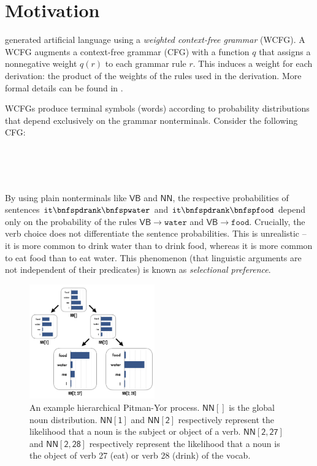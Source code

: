 \documentclass[11pt]{article}
\renewcommand{\bnfpn}[1]{\mathsf{#1}}
\renewcommand{\bnfpo}{\rightarrow}
\renewcommand{\bnfts}[1]{\mathtt{#1}}
\begin{document}
\section{Motivation}



\citet{white-cotterell-2021-examining} generated artificial language using a \emph{weighted context-free grammar} (WCFG). A WCFG augments a context-free grammar (CFG) with a function $q$ that assigns a nonnegative weight $q(r)$ to each grammar rule $r$. This induces a weight for each derivation: the product of the weights of the rules used in the derivation. More formal details can be found in \citet{collins2013lexicalized}. 

WCFGs produce terminal symbols (words) according to probability distributions that depend exclusively on the grammar nonterminals. Consider the following CFG:
\begin{bnf*}
 {\bnfpn{NN} \bnfsp \bnfpn{VP}} \\
 {\bnfpn{VB} \bnfsp \bnfpn{NN}}\\
 {\bnfts{drank} \bnfor \bnfts{ate}} \\
 {\bnfts{you} \bnfor \bnfts{it} \bnfor \bnfts{water} \bnfor \bnfts{food}}
\end{bnf*}
By using plain nonterminals like $\bnfpn{VB}$ and $\bnfpn{NN}$, the respective probabilities of sentences $\bnfts{it} \bnfsp \bnfts{drank} \bnfsp \bnfts{water}$ and $\bnfts{it} \bnfsp \bnfts{drank} \bnfsp \bnfts{food}$ depend only on the probability of the rules $\bnfpn{VB} \bnfpo \bnfts{water}$ and $\bnfpn{VB} \bnfpo \bnfts{food}$. Crucially, the verb choice does not differentiate the sentence probabilities. This is unrealistic -- it is more common to drink water than to drink food, whereas it is more common to eat food than to eat water. This phenomenon (that linguistic arguments are not independent of their predicates) is known as \emph{selectional preference}.

\begin{figure}[t]
\centering
\includegraphics[width=0.48\textwidth]{images/hierarchical_process.png}
\caption{An example hierarchical Pitman-Yor process. $\bnfpn{NN[]}$ is the global noun distribution. $\bnfpn{NN[1]}$ and $\bnfpn{NN[2]}$ respectively represent the likelihood that a noun is the subject or object of a verb. $\bnfpn{NN[2, 27]}$ and $\bnfpn{NN[2, 28]}$ respectively represent the likelihood that a noun is the object of verb 27 (eat) or verb 28 (drink) of the vocab.}
\label{fig:hierarchical_process}
\end{figure}
\end{document}
